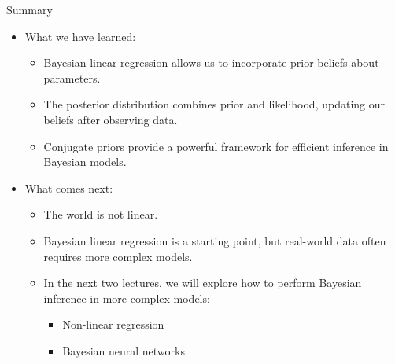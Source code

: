 \documentclass{beamer}
\begin{document}
\begin{frame}{Summary}
  \begin{itemize}
    \item What we have learned:
  \begin{itemize}
    \item Bayesian linear regression allows us to incorporate prior beliefs about parameters.
    \item The posterior distribution combines prior and likelihood, updating our beliefs after observing data.
    \item Conjugate priors provide a powerful framework for efficient inference in Bayesian models.
    \end{itemize}
  \item What comes next:
    \begin{itemize}
    \item The world is not linear.
    \item Bayesian linear regression is a starting point, but real-world data often requires more complex models.
    \item In the next two lectures, we will explore how to perform Bayesian inference in more complex models:
      \begin{itemize}
        \item Non-linear regression
        \item Bayesian neural networks
        \end{itemize}
      \end{itemize}
  \end{itemize}
\end{frame}
\end{document}
